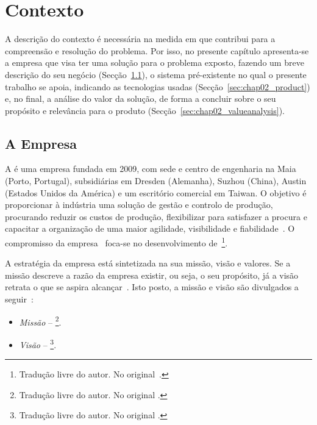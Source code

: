 \chapter{Contexto}
\label{chap:Chapter2}
A descrição do contexto é necessária na medida em que contribui para a compreensão e resolução do problema. Por isso, no presente capítulo apresenta-se a empresa que visa ter uma solução para o problema exposto, fazendo um breve descrição do seu negócio (Secção~\ref{sec:chap02_company}), o sistema pré-existente no qual o presente trabalho se apoia, indicando as tecnologias usadas (Secção~\ref{sec:chap02_product}) e, no final, a análise do valor da solução, de forma a concluir sobre o seu propósito e relevância para o produto (Secção~\ref{sec:chap02_valueanalysis}).  

\section{A Empresa}
\label{sec:chap02_company}
A {\companyname} é uma empresa fundada em 2009, com sede e centro de engenharia na Maia (Porto, Portugal), subsidiárias em Dresden (Alemanha), Suzhou (China), Austin (Estados Unidos da América) e um escritório comercial em Taiwan. O objetivo é proporcionar à indústria uma solução de gestão e controlo de produção, procurando reduzir os custos de produção, flexibilizar para satisfazer a procura e capacitar a organização de uma maior agilidade, visibilidade e fiabilidade~\parencite{cmf_overview}. O compromisso da empresa~\parencite{cmf_overview} foca-se no desenvolvimento de~\footnote{Tradução livre do autor. No original~.}.

A estratégia da empresa está sintetizada na sua missão, visão e valores. Se a missão descreve a razão da empresa existir, ou seja, o seu propósito, já a visão retrata o que se aspira alcançar~\parencite[pp.~65-66]{mission_vision_values_what_do_they_say}. Isto posto, a missão e visão são divulgados a seguir~\parencite{cmf_strategy}: 

\begin{itemize}
    \item 
    {
        \textit{Missão} -- \footnote{Tradução livre do autor. No original .}.
    }
    \item 
    {
        \textit{Visão} -- \footnote{Tradução livre do autor. No original .}.
    }
\end{itemize}


